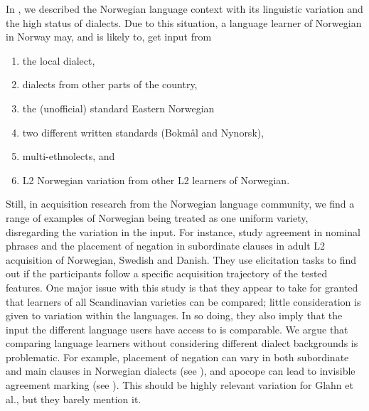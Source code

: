 \documentclass[output=paper,colorlinks,citecolor=brown,modfonts,nonflat]{../langscibook}
\begin{document}
In , we described the Norwegian language context with its linguistic variation and the high status of dialects. Due to this situation, a language learner of Norwegian in Norway may, and is likely to, get input from 

\begin{enumerate}[label=\alph*.]
\item the local dialect, 
\item dialects from other parts of the country, 
\item the (unofficial) standard Eastern Norwegian 
\item two different written standards (Bokmål and Nynorsk), 
\item multi-ethnolects, and 
\item L2 Norwegian variation from other L2 learners of Norwegian.
\end{enumerate}
Still, in acquisition research from the Norwegian language community, we find a range of examples of Norwegian being treated as one uniform variety, disregarding the variation in the input. For instance, \citet{GlahnEtAl2001} study agreement in nominal phrases and the placement of negation in subordinate clauses in adult L2 acquisition of Norwegian, Swedish and Danish. They use elicitation tasks to find out if the participants follow a specific acquisition trajectory of the tested features. One major issue with this study is that they appear to take for granted that learners of all Scandinavian varieties can be compared; little consideration is given to variation within the languages. In so doing, they also imply that the input the different language users have access to is comparable. We argue that comparing language learners without considering different dialect backgrounds is problematic. For example, placement of negation can vary in both subordinate and main clauses in Norwegian dialects (see \citealt{Bentzen2007}), and apocope can lead to invisible agreement marking (see ). This should be highly relevant variation for Glahn et al., but they barely mention it. 
\end{document}
